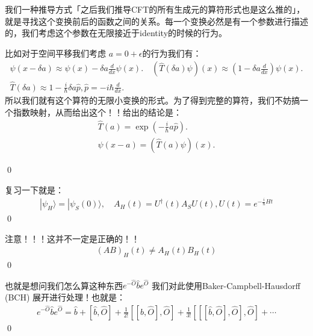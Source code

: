 

我们一种推导方式「之后我们推导CFT的所有生成元的算符形式也是这么推的」，就是寻找这个变换前后的函数之间的关系。每一个变换必然是有一个参数进行描述的，我们考虑这个参数在无限接近于identity的时候的行为。

比如对于空间平移我们考虑 $ a = 0 + \epsilon $的行为我们有：
\begin{align}
  \psi(x-\delta a)\approx\psi(x)-\delta a\frac{d}{dx}\psi(x).\quad
  (\hat{T}(\delta a)\psi)(x)\approx\left(1-\delta a\frac{d}{dx}\right)\psi(x).\\
  \hat{T}(\delta a)\approx1-\frac{i}{\hbar}\delta
  a\hat{p},\hat{p}=-i\hbar\frac{d}{dx}.
\end{align}
所以我们就有这个算符的无限小变换的形式。为了得到完整的算符，我们不妨搞一个指数映射，从而给出这个！！给出的结论是：
\begin{align}
  \hat{T}(a)=\exp\left(-\frac{i}{\hbar}a\hat{p}\right).\\
  \psi(x-a) = (\hat{T}(a)\psi)(x).
\end{align}

\qed

\bigskip
{}

复习一下就是：
\begin{align}
  |\psi_H\rangle=|\psi_S(0)\rangle,\quad
  A_H(t)=U^\dagger(t)A_SU(t),U(t)=e^{-\frac{i}{\hbar}Ht}
\end{align}
\qed

\bigskip
{}

注意！！！这并不一定是正确的！！
\begin{align}
  (AB)_H(t)\neq A_H(t)B_H(t)
\end{align}
\qed

\bigskip
{}

也就是想问我们怎么算这种东西$ e^{-\hat{O}}\hat{b}e^{\hat{O}} $
我们对此使用Baker-Campbell-Hausdorff (BCH) 展开进行处理！也就是：
\begin{align}
  e^{-\hat{O}}\hat{b}e^{\hat{O}}=\hat{b}+[\hat{b},\hat{O}]+\frac{1}{2!}[[\hat{b},\hat{O}],\hat{O}]+\frac{1}{3!}[[[\hat{b},\hat{O}],\hat{O}],\hat{O}]+\cdots
\end{align}
\qed
